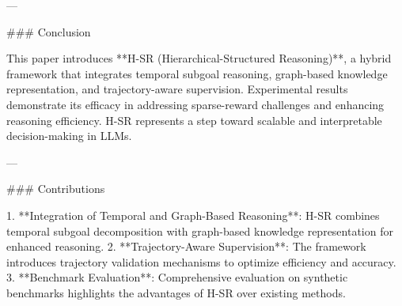---

### Conclusion  

This paper introduces **H-SR (Hierarchical-Structured Reasoning)**, a hybrid framework that integrates temporal subgoal reasoning, graph-based knowledge representation, and trajectory-aware supervision. Experimental results demonstrate its efficacy in addressing sparse-reward challenges and enhancing reasoning efficiency. H-SR represents a step toward scalable and interpretable decision-making in LLMs.

---

### Contributions  

1. **Integration of Temporal and Graph-Based Reasoning**: H-SR combines temporal subgoal decomposition with graph-based knowledge representation for enhanced reasoning.  
2. **Trajectory-Aware Supervision**: The framework introduces trajectory validation mechanisms to optimize efficiency and accuracy.  
3. **Benchmark Evaluation**: Comprehensive evaluation on synthetic benchmarks highlights the advantages of H-SR over existing methods.  


